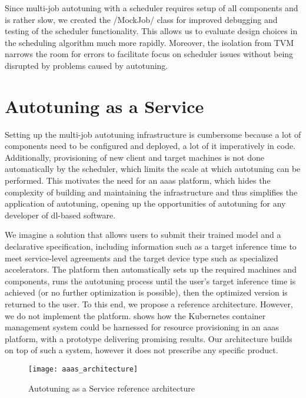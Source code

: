 Since multi-job autotuning with a scheduler requires setup of all components and is rather slow, we created the \pythoninline/MockJob/ class for improved debugging and testing of the scheduler functionality. This allows us to evaluate design choices in the scheduling algorithm much more rapidly. Moreover, the isolation from TVM narrows the room for errors to facilitate focus on scheduler issues without being disrupted by problems caused by autotuning.

\section{Autotuning as a Service}
Setting up the multi-job autotuning infrastructure is cumbersome because a lot of components need to be configured and deployed, a lot of it imperatively in code. Additionally, provisioning of new client and target machines is not done automatically by the scheduler, which limits the scale at which autotuning can be performed. This motivates the need for an \gls{aaas} platform, which hides the complexity of building and maintaining the infrastructure and thus simplifies the application of autotuning, opening up the opportunities of autotuning for any developer of \gls{dl}-based software.

We imagine a solution that allows users to submit their trained model and a declarative specification, including information such as a target inference time to meet service-level agreements and the target device type such as specialized accelerators. The platform then automatically sets up the required machines and components, runs the autotuning process until the user's target inference time is achieved (or no further optimization is possible), then the optimized version is returned to the user. To this end, we propose a reference architecture. However, we do not implement the platform. \cite{Cho.2019} shows how the Kubernetes container management system could be harnessed for resource provisioning in an \gls{aaas} platform, with a prototype delivering promising results. Our architecture builds on top of such a system, however it does not prescribe any specific product.

\begin{figure}[h]
	\centering
	\texttt{[image: aaas\_architecture]}%
	\caption{Autotuning as a Service reference architecture}
	\label{fig:aaas-architecture}
\end{figure}

